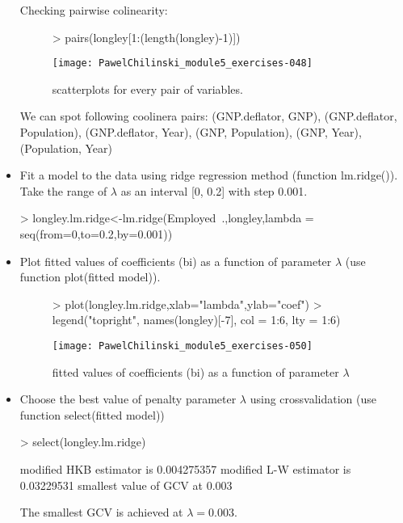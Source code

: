 \documentclass[a4paper]{article}
\begin{document}
\begin{itemize}
Checking pairwise colinearity:
\begin{figure}[H]
\begin{center}
\begin{Schunk}
\begin{Sinput}
> pairs(longley[1:(length(longley)-1)])	
\end{Sinput}
\end{Schunk}
\texttt{[image: PawelChilinski\_module5\_exercises-048]}
\caption{scatterplots for every pair of variables.}
\end{center}
\end{figure}
We can spot following coolinera pairs: (GNP.deflator, GNP),
(GNP.deflator, Population), (GNP.deflator, Year), (GNP, Population), (GNP,
Year), (Population, Year)
\item Fit a model to the data using ridge regression method (function
lm.ridge()). Take the range of $\lambda$ as an interval [0, 0.2] with step 0.001.
\begin{Schunk}
\begin{Sinput}
> longley.lm.ridge<-lm.ridge(Employed~.,longley,lambda = seq(from=0,to=0.2,by=0.001))
\end{Sinput}
\end{Schunk}
\item Plot fitted values of coefficients (bi) as a function of parameter $\lambda$ (use
function plot(fitted model)).
\begin{figure}[H]
\begin{center}
\begin{Schunk}
\begin{Sinput}
> plot(longley.lm.ridge,xlab="lambda",ylab="coef")
> legend("topright", names(longley)[-7], col = 1:6, lty = 1:6)
\end{Sinput}
\end{Schunk}
\texttt{[image: PawelChilinski\_module5\_exercises-050]}
\caption{fitted values of coefficients (bi) as a function of parameter $\lambda$}
\end{center}
\end{figure}
\item Choose the best value of penalty parameter $\lambda$ using crossvalidation (use
function select(fitted model))
\begin{Schunk}
\begin{Sinput}
> select(longley.lm.ridge)	
\end{Sinput}
\begin{Soutput}
modified HKB estimator is 0.004275357 
modified L-W estimator is 0.03229531 
smallest value of GCV  at 0.003 
\end{Soutput}
\end{Schunk}
The smallest GCV is achieved at $\lambda=$0.003. 


\end{itemize}
\end{document}
